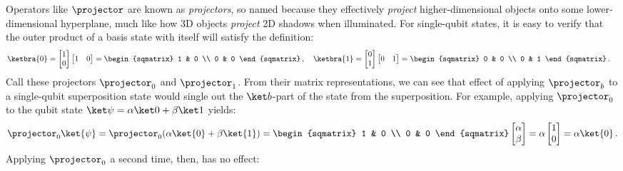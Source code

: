       \noindent
      Operators like $\projector$ are known as \emph{projectors}, so named because they 
        effectively \emph{project} higher-dimensional objects onto some lower-dimensional
        hyperplane, much like how 3D objects \emph{project} 2D shadows when
        illuminated.
        For single-qubit states, it is easy to verify that the outer product 
        of a basis state with itself will satisfy the definition: 
      \[
        \ketbra{0}
        = \begin{bmatrix} 1 \\ 0 \end{bmatrix} \begin{bmatrix} 1 & 0 \end{bmatrix}
        = \begin{sqmatrix} 
          1 & 0 \\ 
          0 & 0 
        \end{sqmatrix}\, , \quad
        \ketbra{1}
        = \begin{bmatrix} 0 \\ 1 \end{bmatrix} \begin{bmatrix} 0 & 1 \end{bmatrix}
        = \begin{sqmatrix} 
          0 & 0 \\ 
          0 & 1 
        \end{sqmatrix}\, . \quad
      \]
      Call these projectors $\projector_0$ and $\projector_1$.
        From their matrix representations, we can see that effect of applying
        $\projector_b$ to a single-qubit superposition state would single out the
        $\ket b$-part of the state from the superposition. For example, applying
        $\projector_0$ to the qubit state $\ket \psi = \alpha \ket 0 +
        \beta \ket 1$ yields:
      \[
        \projector_0 \ket{\psi} = \projector_0(\alpha \ket{0} + \beta \ket{1})
        = \begin{sqmatrix} 1 & 0 \\ 0 & 0 \end{sqmatrix} \begin{bmatrix} \alpha \\ \beta \end{bmatrix} 
        = \alpha \begin{bmatrix} 1 \\ 0 \end{bmatrix} = \alpha \ket{0}\, .
      \]
      Applying $\projector_0$ a second time, then, has no effect:

